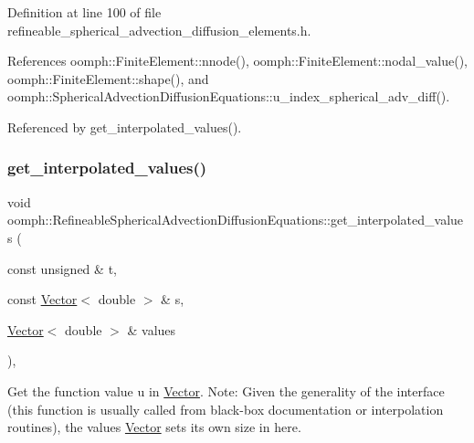 Definition at line 100 of file refineable\+\_\+spherical\+\_\+advection\+\_\+diffusion\+\_\+elements.\+h.



References oomph\+::\+Finite\+Element\+::nnode(), oomph\+::\+Finite\+Element\+::nodal\+\_\+value(), oomph\+::\+Finite\+Element\+::shape(), and oomph\+::\+Spherical\+Advection\+Diffusion\+Equations\+::u\+\_\+index\+\_\+spherical\+\_\+adv\+\_\+diff().



Referenced by get\+\_\+interpolated\+\_\+values().

\mbox{\label{classoomph_1_1RefineableSphericalAdvectionDiffusionEquations_a208a004e8b7403001400d7de2ebd692f}} 
\subsubsection{\texorpdfstring{get\+\_\+interpolated\+\_\+values()}{get\_interpolated\_values()}\hspace{0.1cm}{\footnotesize\ttfamily [2/2]}}
{\footnotesize\ttfamily void oomph\+::\+Refineable\+Spherical\+Advection\+Diffusion\+Equations\+::get\+\_\+interpolated\+\_\+values (\begin{DoxyParamCaption}\item[{const unsigned \&}]{t,  }\item[{const \hyperlink{classoomph_1_1Vector}{Vector}$<$ double $>$ \&}]{s,  }\item[{\hyperlink{classoomph_1_1Vector}{Vector}$<$ double $>$ \&}]{values }\end{DoxyParamCaption})\hspace{0.3cm}{\ttfamily [inline]}, {\ttfamily [virtual]}}



Get the function value u in \hyperlink{classoomph_1_1Vector}{Vector}. Note\+: Given the generality of the interface (this function is usually called from black-\/box documentation or interpolation routines), the values \hyperlink{classoomph_1_1Vector}{Vector} sets its own size in here. 



